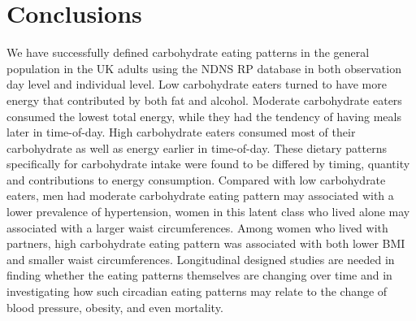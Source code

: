 \section{Conclusions}

We have successfully defined carbohydrate eating patterns in the general population in the UK adults using the NDNS RP database in both observation day level and individual level. Low carbohydrate eaters turned to have more energy that contributed by both fat and alcohol. Moderate carbohydrate eaters consumed the lowest total energy, while they had the tendency of having meals later in time-of-day. High carbohydrate eaters consumed most of their carbohydrate as well as energy earlier in time-of-day. These dietary patterns specifically for carbohydrate intake were found to be differed by timing, quantity and contributions to energy consumption. Compared with low carbohydrate eaters, men had moderate carbohydrate eating pattern may associated with a lower prevalence of hypertension, women in this latent class who lived alone may associated with a larger waist circumferences. Among women who lived with partners, high carbohydrate eating pattern was associated with both lower BMI and smaller waist circumferences. Longitudinal designed studies are needed in finding whether the eating patterns themselves are changing over time and in investigating how such circadian eating patterns may relate to the change of blood pressure, obesity, and even mortality.